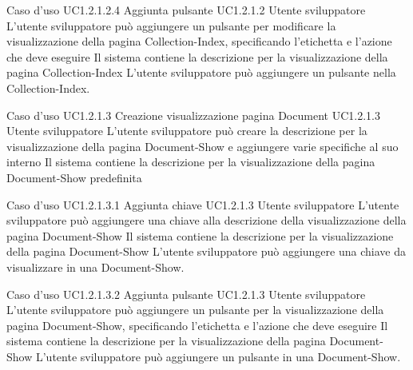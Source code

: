 \UCtitle
{Caso d'uso UC1.2.1.2.4}
{Aggiunta pulsante}
\UC
{UC1.2.1.2}
{Utente sviluppatore}
{L'utente sviluppatore può aggiungere un pulsante per modificare la visualizzazione della pagina Collection-Index, specificando l'etichetta e l'azione che deve eseguire}
{Il sistema contiene la descrizione per la visualizzazione della pagina Collection-Index}
\scenario
{L'utente sviluppatore può aggiungere un pulsante nella Collection-Index.}


\UCtitle
{Caso d'uso UC1.2.1.3}
{Creazione visualizzazione pagina Document}
\UC
{UC1.2.1.3}
{Utente sviluppatore}
{L'utente sviluppatore  può creare la descrizione per la visualizzazione della pagina Document-Show e aggiungere varie specifiche al suo interno}
{Il sistema contiene la descrizione per la visualizzazione della pagina Document-Show predefinita}

\UCtitle
{Caso d'uso UC1.2.1.3.1}
{Aggiunta chiave}
\UC
{UC1.2.1.3}
{Utente sviluppatore}
{L'utente sviluppatore  può aggiungere una chiave alla descrizione della visualizzazione della pagina Document-Show}
{Il sistema contiene la descrizione per la visualizzazione della pagina Document-Show}
\scenario
{L'utente sviluppatore può aggiungere una chiave da visualizzare in una Document-Show.}

\UCtitle
{Caso d'uso UC1.2.1.3.2}
{Aggiunta pulsante}
\UC
{UC1.2.1.3}
{Utente sviluppatore}
{L'utente sviluppatore può aggiungere un pulsante per la visualizzazione della pagina Document-Show, specificando l'etichetta e l'azione che deve eseguire}
{Il sistema contiene la descrizione per la visualizzazione della pagina Document-Show}
\scenario
{L'utente sviluppatore può aggiungere un pulsante in una Document-Show.}


